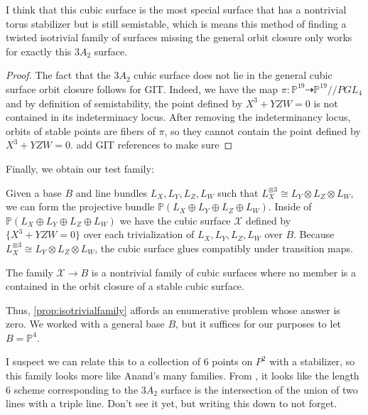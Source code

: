 \documentclass[12pt,reqno]{amsart}
\renewcommand{\to}{{\longrightarrow}}
\numberwithin{equation}{section}
\begin{document}
\begin{remark}
  I think that this cubic surface is the most special surface that has
  a nontrivial torus stabilizer but is still semistable, which is
  means this method of finding a twisted isotrivial family of surfaces
  missing the general orbit closure only works for exactly this $3A_2$
  surface.
\end{remark}

\begin{proof}
  The fact that the $3A_2$ cubic surface does not lie in the general
  cubic surface orbit closure follows for GIT. Indeed, we have the map
  $\pi: \mathbb{P}^{19}\dashrightarrow \mathbb{P}^{19}//PGL_4$ and by
  definition of semistability, the point defined by $X^3 + YZW = 0$ is
  not contained in its indeterminacy locus. After removing the
  indeterminancy locus, orbits of stable points are fibers of $\pi$,
  so they cannot contain the point defined by $X^3 + YZW =
  0$. {\color{red} add GIT references to make sure}
\end{proof}

Finally, we obtain our test family:
\begin{proposition}
\label{prop:isotrivialfamily}
Given a base $B$ and line bundles $L_X, L_Y, L_Z, L_W$ such that $L_X^{\otimes 3}\cong L_Y\otimes L_Z\otimes L_W$, we can form the projective bundle $\mathbb{P}(L_X\oplus L_Y\oplus L_Z\oplus L_W)$. Inside of $\mathbb{P}(L_X\oplus L_Y\oplus L_Z\oplus L_W)$ we have the cubic surface $\mathcal{X}$ defined by $\{X^3 + YZW = 0\}$ over each trivialization of $L_X, L_Y, L_Z, L_W$ over $B$. Because $L_X^{\otimes 3}\cong L_Y\otimes L_Z\otimes L_W$, the cubic surface glues compatibly under transition maps.

The family $\mathcal{X}\to B$ is a nontrivial family of cubic surfaces where no member is a contained in the orbit closure of a stable cubic surface.
\end{proposition}

Thus, \autoref{prop:isotrivialfamily} affords an enumerative problem whose answer is zero. We worked with a general base $B$, but it suffices for our purposes to let $B=\mathbb{P}^4$. 

{\color{red} I suspect we can relate this to a collection of 6 points on $P^2$ with a stabilizer, so this family looks more like Anand's many families. From \cite[Proposition 3.3]{N05}, it looks like the length 6 scheme corresponding to the $3A_2$ surface is the intersection of the union of two lines with a triple line. Don't see it yet, but writing this down to not forget.}
\end{document}
